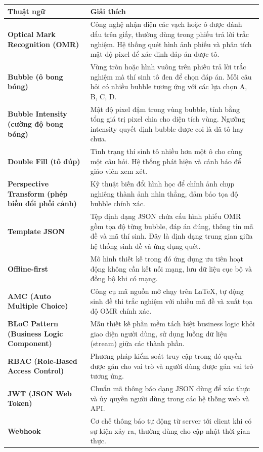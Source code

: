 \documentclass[../DoAn.tex]{subfiles}
\begin{document}
\begin{longtable}{l p{14cm}}
\hline
   \textbf{Thuật ngữ}  & \textbf{Giải thích} \\ \hline 
   \textbf{Optical Mark Recognition (OMR)} & Công nghệ nhận diện các vạch hoặc ô được đánh dấu trên giấy, thường dùng trong phiếu trả lời trắc nghiệm. Hệ thống quét hình ảnh phiếu và phân tích mật độ pixel để xác định đáp án được tô. \\
   \textbf{Bubble (ô bong bóng)} & Vùng tròn hoặc hình vuông trên phiếu trả lời trắc nghiệm mà thí sinh tô đen để chọn đáp án. Mỗi câu hỏi có nhiều bubble tương ứng với các lựa chọn A, B, C, D. \\
   \textbf{Bubble Intensity (cường độ bong bóng)} & Mật độ pixel đậm trong vùng bubble, tính bằng tổng giá trị pixel chia cho diện tích vùng. Ngưỡng intensity quyết định bubble được coi là đã tô hay chưa. \\
   \textbf{Double Fill (tô đúp)} & Tình trạng thí sinh tô nhiều hơn một ô cho cùng một câu hỏi. Hệ thống phát hiện và cảnh báo để giáo viên xem xét. \\
   \textbf{Perspective Transform (phép biến đổi phối cảnh)} & Kỹ thuật biến đổi hình học để chỉnh ảnh chụp nghiêng thành ảnh nhìn thẳng, đảm bảo tọa độ bubble chính xác. \\
   \textbf{Template JSON} & Tệp định dạng JSON chứa cấu hình phiếu OMR gồm tọa độ từng bubble, đáp án đúng, thông tin mã đề và mã thí sinh. Đây là định dạng trung gian giữa hệ thống sinh đề và ứng dụng quét. \\
   \textbf{Offline-first} & Mô hình thiết kế trong đó ứng dụng ưu tiên hoạt động không cần kết nối mạng, lưu dữ liệu cục bộ và đồng bộ khi có mạng. \\
   \textbf{AMC (Auto Multiple Choice)} & Công cụ mã nguồn mở chạy trên LaTeX, tự động sinh đề thi trắc nghiệm với nhiều mã đề và xuất tọa độ OMR chính xác. \\
   \textbf{BLoC Pattern (Business Logic Component)} & Mẫu thiết kế phần mềm tách biệt business logic khỏi giao diện người dùng, sử dụng luồng dữ liệu (stream) giữa các thành phần. \\
   \textbf{RBAC (Role-Based Access Control)} & Phương pháp kiểm soát truy cập trong đó quyền được gán cho vai trò và người dùng được gán vai trò tương ứng. \\
   \textbf{JWT (JSON Web Token)} & Chuẩn mã thông báo dạng JSON dùng để xác thực và ủy quyền người dùng trong các hệ thống web và API. \\
   \textbf{Webhook} & Cơ chế thông báo tự động từ server tới client khi có sự kiện xảy ra, thường dùng cho cập nhật thời gian thực. \\

\end{longtable}
\end{document}
